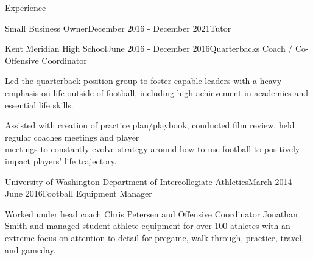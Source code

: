 \documentclass[
	11pt, %
]{resume} %
\begin{document}
\begin{rSection}{Experience}
\begin{rSubsection}{Small Business Owner}{December 2016 - December 2021}{Tutor}{}
        \end{rSubsection}

        \begin{rSubsection}{Kent Meridian High School}{June 2016 - December 2016}{Quarterbacks Coach / Co-Offensive Coordinator}{}
        
            \item Led the quarterback position group to foster capable leaders with a heavy emphasis on life outside of football, including high achievement in academics and essential life skills.
            \item Assisted with creation of practice plan/playbook, conducted film review, held regular coaches meetings and player \\meetings to constantly evolve strategy around how to use football to positively impact players' life trajectory.

            
        \end{rSubsection}

        \begin{rSubsection}{University of Washington Department of Intercollegiate Athletics}{March 2014 - June 2016}{Football Equipment Manager}{}
        
            \item Worked under head coach Chris Petersen and Offensive Coordinator Jonathan Smith and managed student-athlete equipment for over 100 athletes with an extreme focus on attention-to-detail for pregame, walk-through, practice, travel, and gameday.



            
            
        \end{rSubsection}
\end{rSection}
\end{document}
